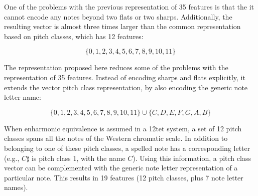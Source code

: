 
One of the problems with the previous representation of 35
features is that the it cannot encode any notes beyond two
flats or two sharps. Additionally, the resulting vector is
almost three times larger than the common representation
based on pitch classes, which has 12 features:

\begin{equation}
    \{0, 1, 2, 3, 4, 5, 6, 7, 8, 9, 10, 11\}
\end{equation}

The representation proposed here reduces some of the
problems with the representation of 35 features. Instead of
encoding sharps and flats explicitly, it extends the vector
pitch class representation, by also encoding the generic
note letter name:

\begin{equation}
    \{0, 1, 2, 3, 4, 5, 6, 7, 8, 9, 10, 11\} \cup \{C, D, E, F, G, A, B\}
\end{equation}

When enharmonic equivalence is assumed in a \gls{12tet}
system, a set of 12 pitch classes spans all the notes of the
Western chromatic scale. In addition to belonging to one of
these pitch classes, a spelled note has a corresponding
letter (e.g., $C\sharp$ is pitch class 1, with the name
$C$). Using this information, a pitch class vector can be
complemented with the generic note letter representation of
a particular note. This results in 19 features (12 pitch
classes, plus 7 note letter names).
